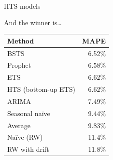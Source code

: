 \documentclass[12pt,aspectratio=169]{beamer}
\begin{document}
\begin{frame}{HTS models}
\end{frame}

\begin{frame}{And the winner is\ldots}
    \centering%
    \begin{tabular}{lr}
        \toprule
        \textbf{Method} & \textbf{MAPE} \\
        \midrule
        BSTS                     & 6.52\% \\
        Prophet                  & 6.58\% \\
        ETS                      & 6.62\% \\
        HTS (bottom\hyp{}up ETS) & 6.62\% \\
        ARIMA                    & 7.49\% \\
        Seasonal naïve           & 9.44\% \\
        Average                  & 9.83\% \\
        Naïve (RW)               & 11.4\% \\
        RW with drift            & 11.8\% \\
        \bottomrule
    \end{tabular}
\end{frame}
\end{document}
